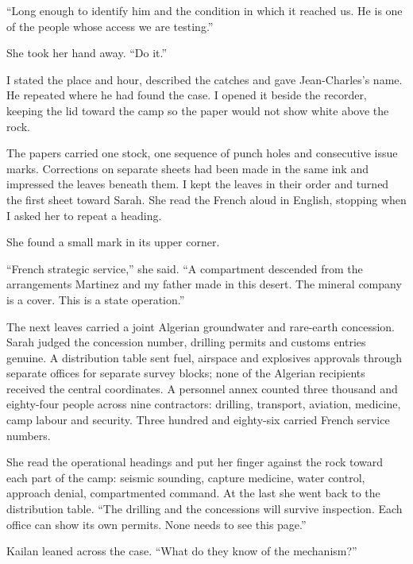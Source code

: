 ``Long enough to identify him and the condition in which it reached us. He is one of the people whose access we are testing.''\par

She took her hand away. ``Do it.''\par

I stated the place and hour, described the catches and gave Jean-Charles's name. He repeated where he had found the case. I opened it beside the recorder, keeping the lid toward the camp so the paper would not show white above the rock.\par

The papers carried one stock, one sequence of punch holes and consecutive issue marks. Corrections on separate sheets had been made in the same ink and impressed the leaves beneath them. I kept the leaves in their order and turned the first sheet toward Sarah. She read the French aloud in English, stopping when I asked her to repeat a heading.\par

She found a small mark in its upper corner.\par

``French strategic service,'' she said. ``A compartment descended from the arrangements Martinez and my father made in this desert. The mineral company is a cover. This is a state operation.''\par

The next leaves carried a joint Algerian groundwater and rare-earth concession. Sarah judged the concession number, drilling permits and customs entries genuine. A distribution table sent fuel, airspace and explosives approvals through separate offices for separate survey blocks; none of the Algerian recipients received the central coordinates. A personnel annex counted three thousand and eighty-four people across nine contractors: drilling, transport, aviation, medicine, camp labour and security. Three hundred and eighty-six carried French service numbers.\par

She read the operational headings and put her finger against the rock toward each part of the camp: seismic sounding, capture medicine, water control, approach denial, compartmented command. At the last she went back to the distribution table. ``The drilling and the concessions will survive inspection. Each office can show its own permits. None needs to see this page.''\par

Kailan leaned across the case. ``What do they know of the mechanism?''\par

